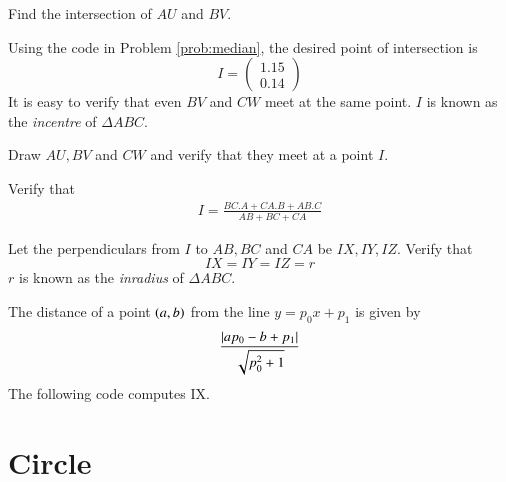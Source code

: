 \documentclass[journal,12pt,twocolumn]{IEEEtran}
\begin{document}
%

\begin{problem}
Find the intersection of $AU$ and $BV$.%
\end{problem}
\solution Using the code in Problem \ref{prob:median}, the desired point of intersection is
\begin{equation}
I = 
\begin{pmatrix}
1.15
\\
0.14
\end{pmatrix}
\end{equation}
%
It is easy to verify that even $BV$ and $CW$ meet at the same point.  $I$ is known as
the {\em incentre} of $\Delta ABC$. 
\begin{problem}
Draw $AU, BV$ and $CW$ and verify that they meet at a point $I$.  
\end{problem}
%
%
\begin{problem}
Verify that
\begin{align}
I = \frac{BC.A + CA.B + AB.C}{AB+BC+CA}
\end{align}
%
\end{problem}
\begin{problem}
\label{prob:incircle_normal}
Let the perpendiculars from $I$ to $AB, BC$ and $CA$ be $IX, IY, IZ$.  Verify that
\begin{equation}
IX = IY = IZ = r
\end{equation}
$r$ is known as the {\em inradius} of $\Delta ABC$.
\end{problem}
\solution
The distance of a point $\left(a,b\right)$ from the line $y = p_0x+p_1$ is given by 
\begin{equation}
\frac{\left\vert ap_0-b+p_1\right\vert}{\sqrt{p_0^2+1}}
\end{equation}
The following code computes IX.

\section{Circle}
\end{document}
